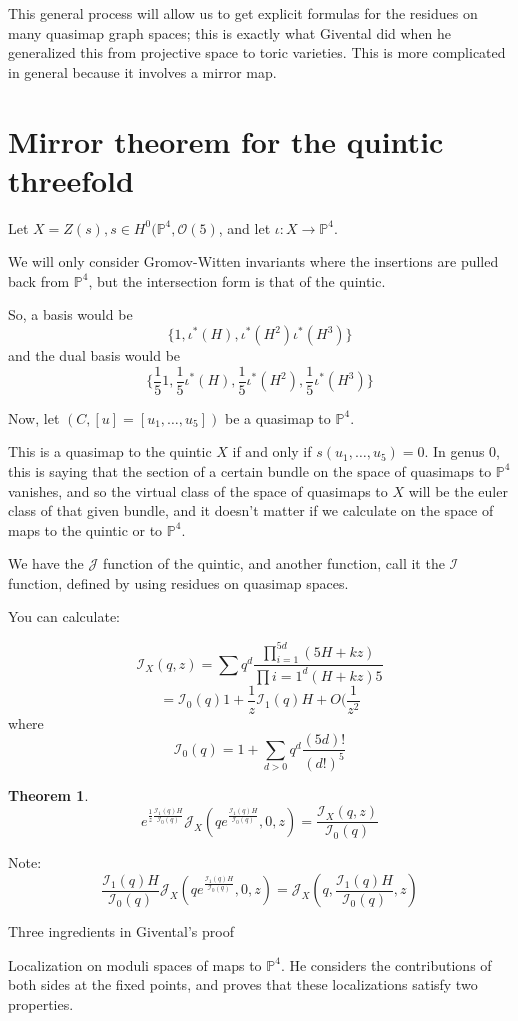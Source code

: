 \documentclass{amsart}
\theoremstyle{definition}
\newtheorem{theorem}[dummy]{Theorem}
\newcommand{\I}{\mathcal{I}}
\newcommand{\OO}{\mathcal{O}}
\newcommand{\proj}{\mathbb{P}}
\newcommand{\J}{\mathcal{J}}
\newcommand{\one}{1}
\begin{document}
This general process will allow us to get explicit formulas for the residues on many quasimap graph spaces; this is exactly what Givental did when he generalized this from projective space to toric varieties.  This is more complicated in general because it involves a mirror map.

\section{Mirror theorem for the quintic threefold}

Let $X=Z(s), s\in H^0(\proj^4,\OO(5)$, and let $\iota:X\to\proj^4$.  

We will only consider Gromov-Witten invariants where the insertions are pulled back from $\proj^4$, but the intersection form is that of the quintic.

So, a basis would be 
$$\{\one,\iota^*(H),\iota^*(H^2)\iota^*(H^3)\}$$
and the dual basis would be
$$\{\frac{1}{5}\one,\frac{1}{5}\iota^*(H),\frac{1}{5}\iota^*(H^2),\frac{1}{5}\iota^*(H^3)\}$$

Now, let $(C, [u]=[u_1,\dots,u_5])$ be a quasimap to $\proj^4$.  

This is a quasimap to the quintic $X$ if and only if $s(u_1,\dots, u_5)=0$.  
In genus 0, this is saying that the section of a certain bundle on the space of quasimaps to $\proj^4$ vanishes, and so the virtual class of the space of quasimaps to $X$ will be the euler class of that given bundle, and it doesn't matter if we calculate on the space of maps to the quintic or to $\proj^4$.

We have the $\J$ function of the quintic, and another function, call it the $\I$ function, defined by using residues on quasimap spaces.

You can calculate:

$$\I_X(q,z)=\sum q^d \frac{\prod_{i=1}^{5d} (5H+kz)}{\prod{i=1}^d(H+kz)5}$$
$$=\I_0(q)\one+\frac{1}{z}\I_1(q)H+O(\frac{1}{z^2}$$
where
$$\I_0(q)=1+\sum_{d>0} q^d\frac{(5d)!}{(d!)^5}$$

\begin{theorem}
$$e^{\frac{1}{z}\frac{\I_1(q)H}{\I_0(q)}}\J_X(qe^{\frac{\I_1(q)H}{\I_0(q)}},0,z)=\frac{\I_X(q,z)}{\I_0(q)}$$
\end{theorem}

Note: 
$$\frac{\I_1(q)H}{\I_0(q)}\J_X(qe^{\frac{\I_1(q)H}{\I_0(q)}},0,z)=\J_X(q, \frac{\I_1(q)H}{\I_0(q)},z)$$

Three ingredients in Givental's proof

Localization on moduli spaces of maps to $\proj^4$.  He considers the contributions of both sides at the fixed points, and proves that these localizations satisfy two properties.
\end{document}
